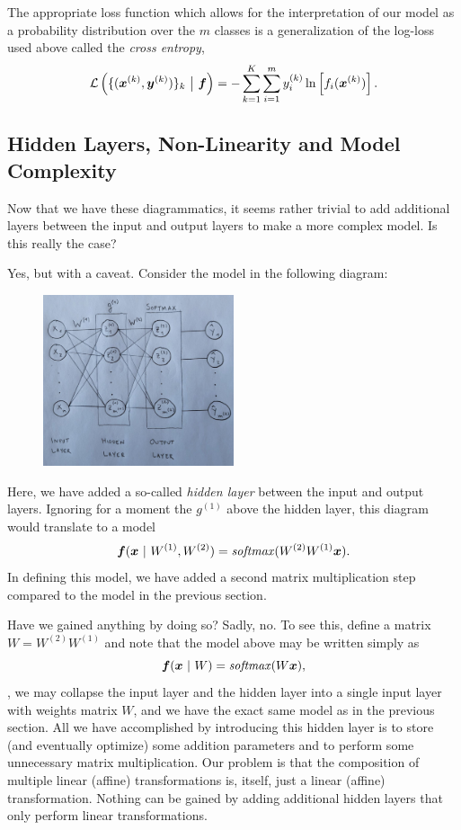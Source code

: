 The appropriate loss function which allows for the interpretation of our model as a probability distribution over the $m$ classes is a generalization of the log-loss used above called the \textit{cross entropy},
%
\begin{equation}
    \mathcal{L}\left(\{(\bm{x}^{(k)}, \bm{y}^{(k)})\}_k ~\big|~ \bm{f}\right) = -\sum_{k=1}^K \sum_{i=1}^m y^{(k)}_i \ln \left[f_i(\bm{x}^{(k)})\right].
\end{equation}
%

%
%
\subsection{Hidden Layers, Non-Linearity and Model Complexity}
%
%
Now that we have these diagrammatics, it seems rather trivial to add additional layers between the input and output layers to make a more complex model.
Is this really the case?

Yes, but with a caveat. Consider the model in the following diagram:
%
\begin{figure}[H]
    \centering
    \includegraphics[width=0.5\textwidth]{../figures/chapter_01/nn_diagram_hidden_layers.png}
\end{figure}
%
\noindent Here, we have added a so-called \textit{hidden layer} between the input and output layers.
Ignoring for a moment the $g^{(1)}$ above the hidden layer, this diagram would translate to a model
%
\begin{equation}
    \bm{f}(\bm{x} ~|~ W^{(1)}, W^{(2)}) = \operatorname*{\text{\textit{softmax}}}(W^{(2)} W^{(1)} \bm{x}).
\end{equation}
%
In defining this model, we have added a second matrix multiplication step compared to the model in the previous section.

Have we gained anything by doing so?
Sadly, no.
To see this, define a matrix $W = W^{(2)} W^{(1)}$ and note that the model above may be written simply as
%
\begin{equation}
    \bm{f}(\bm{x} ~|~ W) = \operatorname*{\text{\textit{softmax}}}(W \bm{x}),
\end{equation}
%
\ie, we may collapse the input layer and the hidden layer into a single input layer with weights matrix $W$, and we have the exact same model as in the previous section.
All we have accomplished by introducing this hidden layer is to store (and eventually optimize) some addition parameters and to perform some unnecessary matrix multiplication.
Our problem is that the composition of multiple linear (affine) transformations is, itself, just a linear (affine) transformation.
Nothing can be gained by adding additional hidden layers that only perform linear transformations.

